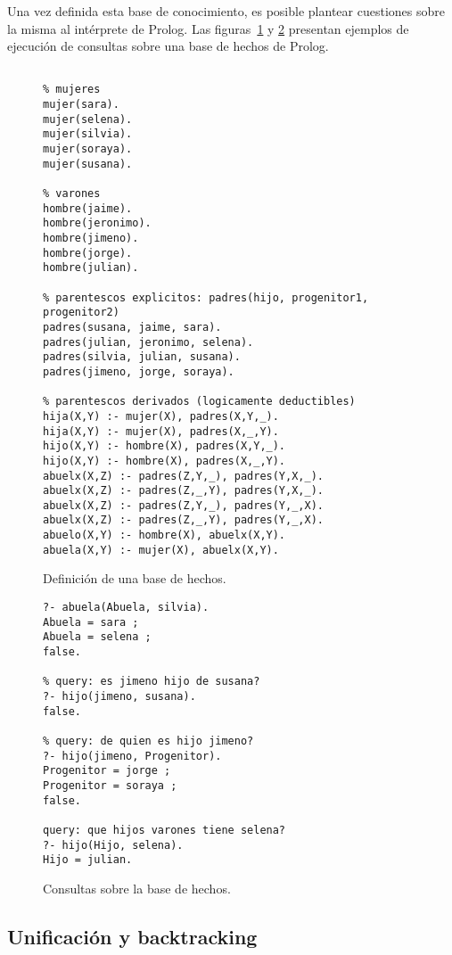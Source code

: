 \documentclass[11pt,captions=nooneline,DIV=14, parskip=full]{scrartcl}
\begin{document}
Una vez definida esta base de conocimiento, es posible plantear cuestiones sobre la misma al intérprete de Prolog. Las figuras~\ref{fig:basehechos} y \ref{fig:queries} presentan ejemplos de ejecución de consultas sobre una base de hechos de Prolog.

\begin{figure}[p]
\lstset{language=Prolog}
\begin{lstlisting}[frame=single]
% base de hechos

% mujeres
mujer(sara).
mujer(selena).
mujer(silvia).
mujer(soraya).
mujer(susana).

% varones
hombre(jaime).
hombre(jeronimo).
hombre(jimeno).
hombre(jorge).
hombre(julian).

% parentescos explicitos: padres(hijo, progenitor1, progenitor2)
padres(susana, jaime, sara).
padres(julian, jeronimo, selena).
padres(silvia, julian, susana).
padres(jimeno, jorge, soraya).

% parentescos derivados (logicamente deductibles)
hija(X,Y) :- mujer(X), padres(X,Y,_).
hija(X,Y) :- mujer(X), padres(X,_,Y).
hijo(X,Y) :- hombre(X), padres(X,Y,_).
hijo(X,Y) :- hombre(X), padres(X,_,Y).
abuelx(X,Z) :- padres(Z,Y,_), padres(Y,X,_).
abuelx(X,Z) :- padres(Z,_,Y), padres(Y,X,_).
abuelx(X,Z) :- padres(Z,Y,_), padres(Y,_,X).
abuelx(X,Z) :- padres(Z,_,Y), padres(Y,_,X).
abuelo(X,Y) :- hombre(X), abuelx(X,Y).
abuela(X,Y) :- mujer(X), abuelx(X,Y).
\end{lstlisting} 
\caption{Definición de una base de hechos.}
\label{fig:basehechos}
\end{figure}

\begin{figure}[h]
\lstset{language=Prolog}
\begin{lstlisting}[frame=single]
% query: quien es abuela de silvia?
?- abuela(Abuela, silvia).
Abuela = sara ;
Abuela = selena ;
false.

% query: es jimeno hijo de susana?
?- hijo(jimeno, susana).
false.

% query: de quien es hijo jimeno?
?- hijo(jimeno, Progenitor).
Progenitor = jorge ;
Progenitor = soraya ;
false.

query: que hijos varones tiene selena?
?- hijo(Hijo, selena).
Hijo = julian.
\end{lstlisting} 
\caption{Consultas sobre la base de hechos.}
\label{fig:queries}
\end{figure}

\subsection{Unificación y backtracking}
\end{document}
